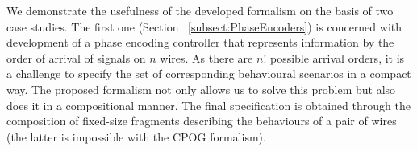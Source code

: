 %
%
%
%
%



We demonstrate the usefulness of the developed formalism on the basis of two case
studies. The first one (Section ~\ref{subsect:PhaseEncoders}) is concerned with development of a phase encoding
controller that represents information by the order of arrival of
signals on $n$ wires. As there are $n!$ possible arrival orders,
it is a challenge to specify the set of corresponding behavioural
scenarios in a compact way. The proposed formalism not only allows us
to solve this problem but also does it in a compositional manner. The final specification is obtained through the composition of fixed-size fragments
describing the behaviours of a pair of wires (the latter is impossible
with the CPOG formalism).





